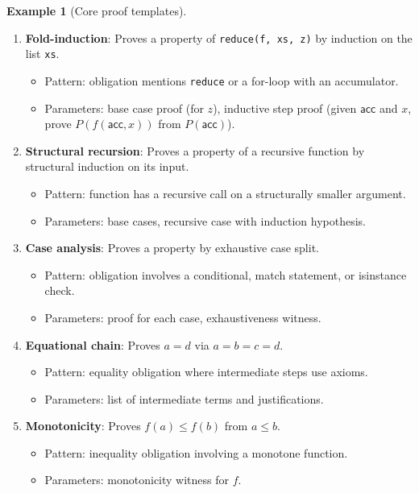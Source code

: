 \documentclass[11pt,a4paper]{report}
\theoremstyle{definition}
\newtheorem{example}[definition]{Example}
\theoremstyle{plain}
\begin{document}
\begin{example}[Core proof templates]
\begin{enumerate}
  \item \textbf{Fold-induction}: Proves a property of \lstinline[style=python]{reduce(f, xs, z)}
    by induction on the list \lstinline[style=python]{xs}.
    \begin{itemize}
      \item Pattern: obligation mentions \lstinline[style=python]{reduce} or a for-loop
        with an accumulator.
      \item Parameters: base case proof (for $z$), inductive step proof
        (given $\mathsf{acc}$ and $x$, prove $P(f(\mathsf{acc}, x))$ from $P(\mathsf{acc})$).
    \end{itemize}

  \item \textbf{Structural recursion}: Proves a property of a recursive function
    by structural induction on its input.
    \begin{itemize}
      \item Pattern: function has a recursive call on a structurally smaller argument.
      \item Parameters: base cases, recursive case with induction hypothesis.
    \end{itemize}

  \item \textbf{Case analysis}: Proves a property by exhaustive case split.
    \begin{itemize}
      \item Pattern: obligation involves a conditional, match statement, or isinstance check.
      \item Parameters: proof for each case, exhaustiveness witness.
    \end{itemize}

  \item \textbf{Equational chain}: Proves $a = d$ via $a = b = c = d$.
    \begin{itemize}
      \item Pattern: equality obligation where intermediate steps use axioms.
      \item Parameters: list of intermediate terms and justifications.
    \end{itemize}

  \item \textbf{Monotonicity}: Proves $f(a) \leq f(b)$ from $a \leq b$.
    \begin{itemize}
      \item Pattern: inequality obligation involving a monotone function.
      \item Parameters: monotonicity witness for $f$.
    \end{itemize}


\end{enumerate}
\end{example}
\end{document}
